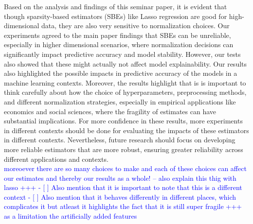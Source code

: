 Based on the analysis and findings of this seminar paper, it is evident that though sparsity-based estimators (SBEs) like Lasso regression are good for high-dimensional data, they are also very sensitive to normalization choices. Our experiments agreed to the main paper findings that SBEs can be unreliable, especially in higher dimensional scenarios, where normalization decisions can significantly impact predictive accuracy and model stability. However, our tests also showed that these might actually not affect model explainability. Our results also highlighted the possible impacts in predictive accuracy of the models in a machine learning contexts. Moreover, the results highlight that is is important to think carefully about how the choice of hyperparameters, preprocessing methods, and different normalization strategies, especially in empirical applications like economics and social sciences, where the fragility of estimates can have substantial implications.  For more confidence in these results, more experiments in different contexts should be done for evaluating the impacts of these estimators in different contexts. Nevertheless, future research should focus on developing more reliable estimators that are more robust, ensuring greater reliability across different applications and contexts.\\

\textcolor{blue}{moreoever there are so many choices to make and each of these choices can affect our estimates and thereby our results as a whole! -- also explain this thig with lasso +++ - [ ] Also mention that it is important to note that this is a different context 
- [ ] Also mention that it behaves differently in different places, which complicates it but atleast it highlights the fact that it is still super fragile
+++ as a limitation the artificially added features}

 
